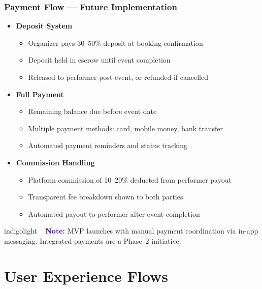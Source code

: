 \documentclass[11pt,a4paper]{article}
\begin{document}
\subsubsection{Payment Flow --- Future Implementation}
\begin{itemize}[leftmargin=1.5em]
  \item \textbf{Deposit System}
    \begin{itemize}[leftmargin=1.5em]
      \item Organizer pays 30--50\% deposit at booking confirmation
      \item Deposit held in escrow until event completion
      \item Released to performer post-event, or refunded if cancelled
    \end{itemize}
  \item \textbf{Full Payment}
    \begin{itemize}[leftmargin=1.5em]
      \item Remaining balance due before event date
      \item Multiple payment methods: card, mobile money, bank transfer
      \item Automated payment reminders and status tracking
    \end{itemize}
  \item \textbf{Commission Handling}
    \begin{itemize}[leftmargin=1.5em]
      \item Platform commission of 10--20\% deducted from performer payout
      \item Transparent fee breakdown shown to both parties
      \item Automated payout to performer after event completion
    \end{itemize}
\end{itemize}

\begin{callout}{indigolight}
  \textbf{\textcolor{indigo}{📌\, Note:}} MVP launches with manual payment
  coordination via in-app messaging. Integrated payments are a Phase~2
  initiative.
\end{callout}

\section{User Experience Flows}
\end{document}
